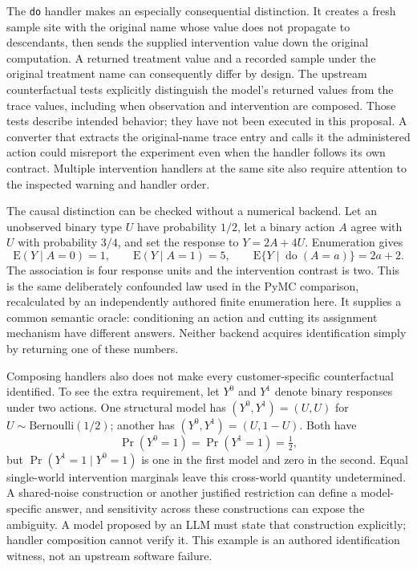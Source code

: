 The \texttt{do} handler makes an especially consequential distinction. It creates a fresh sample site with the original name whose value does not propagate to descendants, then sends the supplied intervention value down the original computation. A returned treatment value and a recorded sample under the original treatment name can consequently differ by design. The upstream counterfactual tests explicitly distinguish the model's returned values from the trace values, including when observation and intervention are composed. Those tests describe intended behavior; they have not been executed in this proposal. A converter that extracts the original-name trace entry and calls it the administered action could misreport the experiment even when the handler follows its own contract. Multiple intervention handlers at the same site also require attention to the inspected warning and handler order. \cite{exec23_numpyro_sources}

The causal distinction can be checked without a numerical backend. Let an unobserved binary type $U$ have probability $1/2$, let a binary action $A$ agree with $U$ with probability $3/4$, and set the response to $Y=2A+4U$. Enumeration gives
\begin{equation}
 \mathrm{E}(Y\mid A=0)=1,\qquad
 \mathrm{E}(Y\mid A=1)=5,\qquad
 \mathrm{E}\{Y\mid\operatorname{do}(A=a)\}=2a+2.
\end{equation}
The association is four response units and the intervention contrast is two. This is the same deliberately confounded law used in the PyMC comparison, recalculated by an independently authored finite enumeration here. It supplies a common semantic oracle: conditioning an action and cutting its assignment mechanism have different answers. Neither backend acquires identification simply by returning one of these numbers. \cite{exec23_pymc_reference,exec23_numpyro_reference}

Composing handlers also does not make every customer-specific counterfactual identified. To see the extra requirement, let $Y^0$ and $Y^1$ denote binary responses under two actions. One structural model has $(Y^0,Y^1)=(U,U)$ for $U\sim\mathrm{Bernoulli}(1/2)$; another has $(Y^0,Y^1)=(U,1-U)$. Both have
\begin{equation}
 \Pr(Y^0=1)=\Pr(Y^1=1)=\tfrac12,
\end{equation}
but $\Pr(Y^1=1\mid Y^0=1)$ is one in the first model and zero in the second. Equal single-world intervention marginals leave this cross-world quantity undetermined. A shared-noise construction or another justified restriction can define a model-specific answer, and sensitivity across these constructions can expose the ambiguity. A model proposed by an LLM must state that construction explicitly; handler composition cannot verify it. This example is an authored identification witness, not an upstream software failure. \cite{exec23_numpyro_reference}

